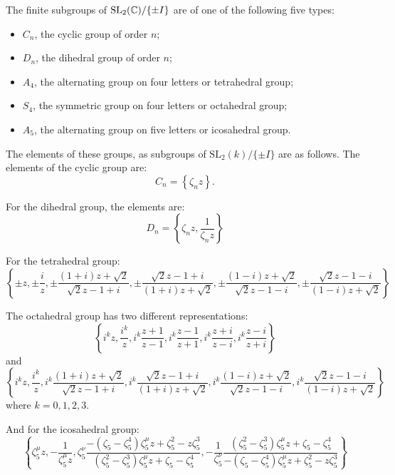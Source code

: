 \begin{proposition}[Klein] \label{Klein:Groups:Prop}
The finite subgroups of $\mbox{SL}_2(\mathbb{C})/\{\pm I \}$ are of one of the
following five types:
\begin{itemize}
\item $C_n$, the cyclic group of order $n$;
\item $D_n$, the dihedral group of order $n$;
\item $A_4$, the alternating group on four letters or tetrahedral group;
\item $S_4$, the symmetric group on four letters or octahedral group;
\item $A_5$, the alternating group on five letters or icosahedral group.
\end{itemize}
\end{proposition}

The elements of these groups, as subgroups of $\mbox{SL}_2(k)/\{\pm I\}$ are as
follows.  The elements of the cyclic group are:
\[
C_n = \left\{\zeta_n z \right\}.
\]

For the dihedral group, the elements are:
\[
D_n = \left\{ \zeta_n z, \frac{1}{\zeta_n z} \right\}
\]

For the tetrahedral group:
\[
\left\{
 \pm z, \pm \frac{i}{z}, 
 \pm \frac{(1+i)z + \sqrt{2}}{\sqrt{2}z - 1 + i},
 \pm \frac{\sqrt{2}z - 1 + i}{(1+i)z + \sqrt{2}},
 \pm \frac{(1-i)z + \sqrt{2}}{\sqrt{2}z - 1 - i},
 \pm \frac{\sqrt{2}z - 1 - i}{(1-i)z + \sqrt{2}}
\right\}
\]

The octahedral group has two different representations:
\[
\left\{
 i^k z, \frac{i^k}{z}, 
 i^k\frac{z+1}{z-1}, i^k\frac{z-1}{z+1}, 
i^k\frac{z+i}{z-i}, i^k\frac{z-i}{z+i}
\right\}
\]
and
\[
\left\{
  i^k z, \frac{i^k}{z}, 
 i^k \frac{(1+i)z + \sqrt{2}}{\sqrt{2}z - 1 + i},
 i^k \frac{\sqrt{2}z - 1 + i}{(1+i)z + \sqrt{2}},
 i^k \frac{(1-i)z + \sqrt{2}}{\sqrt{2}z - 1 - i},
 i^k \frac{\sqrt{2}z - 1 - i}{(1-i)z + \sqrt{2}}
\right\}
\]
where $k = 0, 1, 2, 3$.

And for the icosahedral group:
\[
\left\{
  \zeta_5^{\mu} z, - \frac{1}{\zeta_5^{\mu} z},
  \zeta_5^{\nu} 
   \frac{-(\zeta_5-\zeta_5^4)\zeta_5^\mu z + \zeta_5^2-z\zeta_5^3}
        {(\zeta_5^2-\zeta_5^3)\zeta_5^\mu z + \zeta_5 - \zeta_5^4},
  -\frac{1}{\zeta_5^{\nu}}
   \frac{(\zeta_5^2-\zeta_5^3)\zeta_5^\mu z + \zeta_5 - \zeta_5^4}
        {-(\zeta_5-\zeta_5^4)\zeta_5^\mu z + \zeta_5^2-z\zeta_5^3}
\right\}
\]




